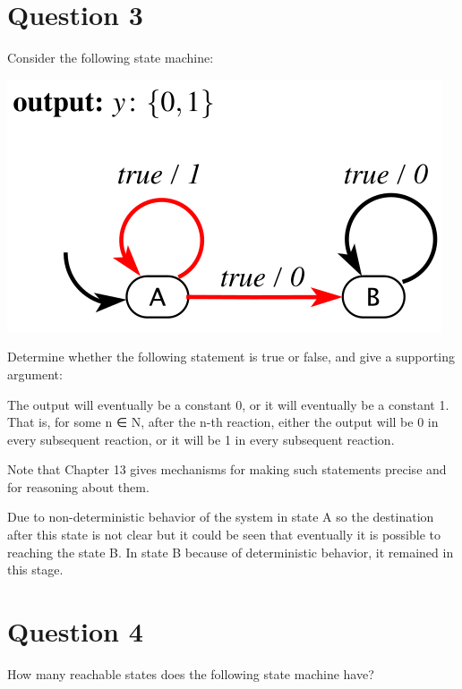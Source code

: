 \documentclass[12pt]{article}
\begin{document}
\vfil
\clearpage













\section{Question 3}
Consider the following state machine:

\centering\includegraphics*[width=0.4\linewidth]{images/img1}



\raggedright Determine whether the following statement is true or false, and give a supporting argument:\newline

The output will eventually be a constant 0, or it will eventually be a
constant 1. That is, for some n ∈ N, after the n-th reaction, either the
output will be 0 in every subsequent reaction, or it will be 1 in every
subsequent reaction.\newline

Note that Chapter 13 gives mechanisms for making such statements precise and for
reasoning about them.

	
\begin{qsolve}[Solution]
	Due to non-deterministic behavior of the system in state A so the destination after this state is not clear but it could be seen that eventually it is possible to reaching the state B. In state B because of deterministic behavior, it remained in this stage.
\end{qsolve}

\vfil
\clearpage












\section{Question 4}
How many reachable states does the following state machine have?\newline
\end{document}
